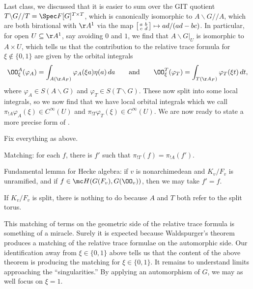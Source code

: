 \documentclass[../notes.tex]{subfiles}
\begin{document}
Last class, we discussed that it is easier to sum over the GIT quotient $T\backslash G//T=\Spec F[G]^{T\times T}$, which is canonically isomorphic to $A\backslash G//A$, which are both birational with $\AA^1$ via the map $\begin{bsmallmatrix}
	a & b \\ c & d
\end{bsmallmatrix}\mapsto ad/(ad-bc)$. In particular, for open $U\subseteq\AA^1$, say avoiding $0$ and $1$, we find that $A\backslash G|_U$ is isomorphic to $A\times U$, which tells us that the contribution to the relative trace formula for $\xi\notin\{0,1\}$ are given by the orbital integrals
\[\OO_\xi^A(\varphi_A)=\int_{A(\AA_F)}\varphi_A(\xi a)\eta(a)\,da\qquad\text{and}\qquad\OO_\xi^T(\varphi_T)=\int_{T(\AA_F)}\varphi_T(\xi t)\,dt,\]
where $\varphi_A\in S(A\backslash G)$ and $\varphi_T\in S(T\backslash G)$. These now split into some local integrals, so we now find that we have local orbital integrals which we call $\pi_{!A}\varphi_A(\xi)\in C^\infty(U)$ and $\pi_{!T}\varphi_T(\xi)\in C^\infty(U)$. We are now ready to state a more precise form of .
\begin{theorem}
	Fix everything as above.
	\begin{listalph}
		\item Matching: for each $f$, there is $f'$ such that $\pi_{!T}(f)=\pi_{!A}(f')$.
		\item Fundamental lemma for Hecke algebra: if $v$ is nonarchimedean and $K_v/F_v$ is unramified, and if $f\in\mc H(G(F_v),G(\OO_v))$, then we may take $f'=f$.
	\end{listalph}
\end{theorem}
\begin{remark}
	If $K_v/F_v$ is split, there is nothing to do because $A$ and $T$ both refer to the split torus.
\end{remark}
This matching of terms on the geometric side of the relative trace formula is something of a miracle. Surely it is expected because Waldspurger's theorem produces a matching of the relative trace formulae on the automorphic side. Our identification away from $\xi\in\{0,1\}$ above tells us that the content of the above theorem is producing the matching for $\xi\in\{0,1\}$. It remains to understand limits approaching the ``singularities.'' By applying an automorphism of $G$, we may as well focus on $\xi=1$.
\end{document}
